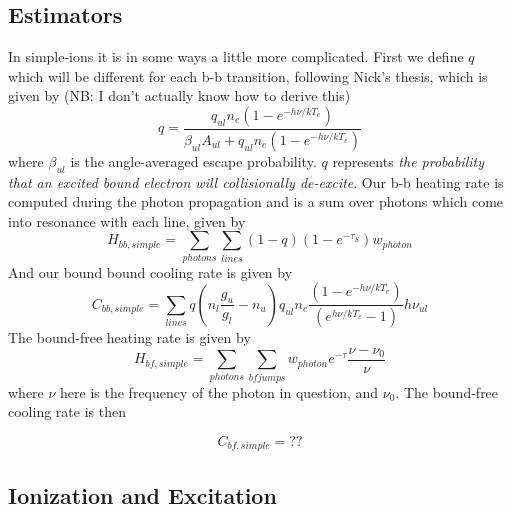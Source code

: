 \subsection{Estimators}
In simple-ions it is in some ways a little more complicated. 
First we define $q$ which will be different for each b-b transition, 
following Nick's thesis, which is given by 
(NB: I don't actually know how to derive this)
\begin{equation}
q = \frac{q_{ul} n_e (1 - e^{-h\nu/kT_e})}{\beta_{ul} A_{ul} + q_{ul} n_e (1 - e^{-h\nu/kT_e})}
\end{equation}
where $\beta_{ul}$ is the angle-averaged escape probability. 
$q$ represents {\em the probability that an excited bound electron
will collisionally de-excite}.
Our b-b heating rate is computed during the photon propagation and is a sum
over photons which come into resonance with each line, given by 
\begin{equation}
H_{bb,simple} = \sum_{photons} \sum_{lines} (1 - q) (1 - e^{-\tau_S}) w_{photon}
\end{equation}
And our bound bound cooling rate is given by 
\begin{equation}
C_{bb,simple} = \sum_{lines} q \left(n_l\frac{g_u}{g_l} - n_u\right) q_{ul} n_e 
\frac{(1 - e^{-h\nu/kT_e})}{(e^{h\nu/kT_e} - 1)}  h \nu_{ul}
\end{equation}
\noindent
The bound-free heating rate is given by
\begin{equation}
H_{bf,simple} = \sum_{photons} \sum_{bfjumps} w_{photon} e^{-\tau} \frac{\nu - \nu_{0}}{\nu}
\end{equation}
where $\nu$ here is the frequency of the photon in question, and $\nu_{0}$.
The bound-free cooling rate is then

\begin{equation}
C_{bf,simple} = ??
\end{equation}

\subsection{Ionization and Excitation}


